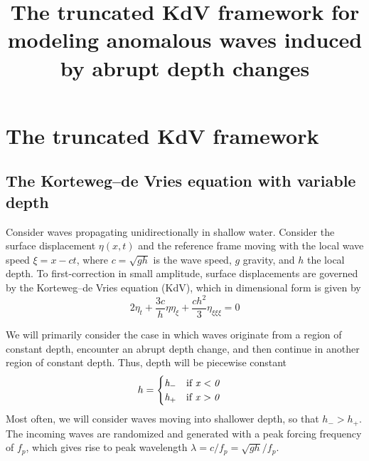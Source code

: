 \documentclass[11pt]{article}
\newcommand{\depth}{h}
\newcommand{\dup}{\depth_{-}}
\newcommand{\ddn}{\depth_{+}}
\newcommand{\freqp}{f_p}
\newcommand{\lam}{\lambda}
\begin{document}
\title{The truncated KdV framework for modeling anomalous waves induced by abrupt depth changes}

\maketitle



\section{The truncated KdV framework}


\subsection{The Korteweg–de Vries equation with variable depth}
Consider waves propagating unidirectionally in shallow water. Consider the surface displacement $\eta(x,t)$ and the reference frame moving with the local wave speed $\xi = x - ct$, where $c = \sqrt{g \depth}$ is the wave speed, $g$ gravity, and $\depth$ the local depth.
To first-correction in small amplitude, surface displacements are governed by the Korteweg–de Vries equation (KdV), which in dimensional form is given by
\begin{equation}
2 \eta_t + \frac{3 c}{\depth} \eta \eta_{\xi} + \frac{c \depth^2}{3} \eta_{\xi \xi \xi} = 0
\end{equation}

We will primarily consider the case in which waves originate from a region of constant depth, encounter an abrupt depth change, and then continue in another region of constant depth. Thus, depth will be piecewise constant
\begin{align}
\depth = 
\begin{cases}
\it \dup \quad \mbox{if } x<0 \\
\it \ddn \quad \mbox{if } x>0
\end{cases}
\end{align}
Most often, we will consider waves moving into shallower depth, so that $\dup > \ddn$. The incoming waves are randomized and generated with a peak forcing frequency of $\freqp$, which gives rise to peak wavelength $\lam = c/\freqp = \sqrt{g \depth} / \freqp$.
\end{document}
